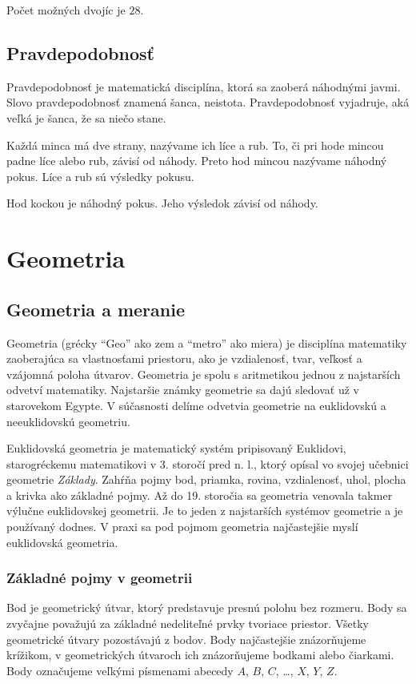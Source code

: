 \documentclass{report}
\begin{document}
\noindent
Počet možných dvojíc je \(28\).

\chapter{Pravdepodobnosť}

Pravdepodobnosť je matematická disciplína, ktorá sa zaoberá náhodnými javmi. Slovo pravdepodobnosť znamená šanca, neistota. Pravdepodobnosť vyjadruje, aká veľká je šanca, že sa niečo stane.

Každá minca má dve strany, nazývame ich líce a rub. To, či pri hode mincou padne líce alebo rub, závisí od náhody. Preto hod mincou nazývame náhodný pokus. Líce a rub sú výsledky pokusu.

Hod kockou je náhodný pokus. Jeho výsledok závisí od náhody.

\part{Geometria}

\chapter{Geometria a meranie}

Geometria (grécky \enquote{Geo} ako zem a \enquote{metro} ako miera) je disciplína matematiky zaoberajúca sa vlastnosťami priestoru, ako je vzdialenosť, tvar, veľkosť a vzájomná poloha útvarov. Geometria je spolu s aritmetikou jednou z najstarších odvetví matematiky. Najstaršie známky geometrie sa dajú sledovať už v starovekom Egypte. V súčasnosti delíme odvetvia geometrie na euklidovskú a neeuklidovskú geometriu.

Euklidovská geometria je matematický systém pripisovaný Euklidovi, starogréckemu matematikovi v 3. storočí pred n. l., ktorý opísal vo svojej učebnici geometrie \emph{Základy}. Zahŕňa pojmy bod, priamka, rovina, vzdialenosť, uhol, plocha a krivka ako základné pojmy. Až do 19. storočia sa geometria venovala takmer výlučne euklidovskej geometrii. Je to jeden z najstarších systémov geometrie a je používaný dodnes. V praxi sa pod pojmom geometria najčastejšie myslí euklidovská geometria.

\section{Základné pojmy v geometrii}

Bod je geometrický útvar, ktorý predstavuje presnú polohu bez rozmeru. Body sa zvyčajne považujú za základné nedeliteľné prvky tvoriace priestor. Všetky geometrické útvary pozostávajú z bodov. Body najčastejšie znázorňujeme krížikom, v geometrických útvaroch ich znázorňujeme bodkami alebo čiarkami. Body označujeme veľkými písmenami abecedy \(A\), \(B\), \(C\), \dots, \(X\), \(Y\), \(Z\).
\end{document}
